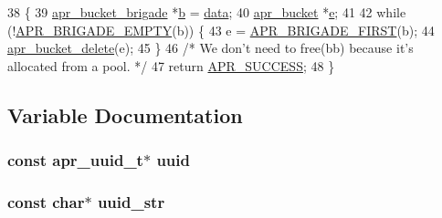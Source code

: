\begin{DoxyCode}
38 \{
39     \hyperlink{structapr__bucket__brigade}{apr\_bucket\_brigade} *\hyperlink{group__APACHE__CORE__PROTO_ga7fa09c5c80a7d25b74511944f5949e31}{b} = \hyperlink{group__APACHE__CORE__LOG_gae4950db1dbfff8459a712737063b61aa}{data};
40     \hyperlink{structapr__bucket}{apr\_bucket} *\hyperlink{group__APR__Util__Bucket__Brigades_gacd90314acb2c2e5cd19681136c08efac}{e};
41 
42     \textcolor{keywordflow}{while} (!\hyperlink{group__APR__Util__Bucket__Brigades_ga836f61da6cce15074eff257ce4b6fc0f}{APR\_BRIGADE\_EMPTY}(b)) \{
43         e = \hyperlink{group__APR__Util__Bucket__Brigades_gab5826a11eb6ba90786a94282f806c230}{APR\_BRIGADE\_FIRST}(b);
44         \hyperlink{group__APR__Util__Bucket__Brigades_ga8925c02a7f95e8c1c3986294d4678797}{apr\_bucket\_delete}(e);
45     \}
46     \textcolor{comment}{/* We don't need to free(bb) because it's allocated from a pool. */}
47     \textcolor{keywordflow}{return} \hyperlink{group__apr__errno_ga9ee311b7bf1c691dc521d721339ee2a6}{APR\_SUCCESS};
48 \}
\end{DoxyCode}


\subsection{Variable Documentation}
\subsubsection[{\texorpdfstring{uuid}{uuid}}]{\setlength{\rightskip}{0pt plus 5cm}const {\bf apr\+\_\+uuid\+\_\+t}$\ast$ uuid}\hypertarget{group__APR__UUID_ga9b3f6ae7758c034f843487ac8ed248c2}{}\label{group__APR__UUID_ga9b3f6ae7758c034f843487ac8ed248c2}
\subsubsection[{\texorpdfstring{uuid\+\_\+str}{uuid_str}}]{\setlength{\rightskip}{0pt plus 5cm}const char$\ast$ uuid\+\_\+str}\hypertarget{group__APR__UUID_ga43024131bfac4b8508fee85d0a41665d}{}\label{group__APR__UUID_ga43024131bfac4b8508fee85d0a41665d}
